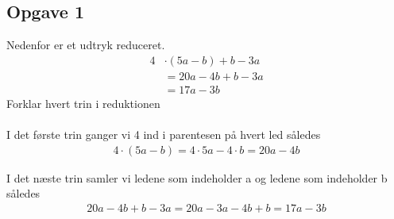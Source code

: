 \subsection{Opgave 1}

Nedenfor er et udtryk reduceret.\\
\begin{align*}
    4&\cdot (5a-b)+b-3a\\
    &=20a-4b+b-3a\\
    &=17a-3b
\end{align*}
Forklar hvert trin i reduktionen\\\\

\ans
I det første trin ganger vi 4 ind i parentesen på hvert led således
\begin{align*}
    4\cdot (5a-b)=4\cdot 5a - 4\cdot b=20a-4b
\end{align*}

I det næste trin samler vi ledene som indeholder a og ledene som indeholder b således
\begin{align*}
    20a -4b + b - 3a = 20a - 3a - 4b + b = 17a - 3b
\end{align*}
